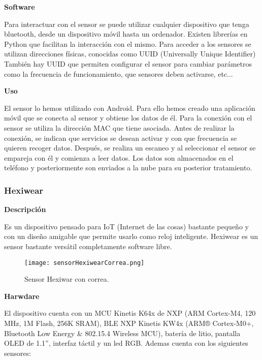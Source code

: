 \documentclass[11pt,spanish]{article}
\begin{document}
{\bf Software}
\newline

Para interactuar con el sensor se puede utilizar cualquier dispositivo que tenga bluetooth, desde un dispositivo móvil hasta un ordenador. Existen librerías en Python que facilitan la interacción con el mismo. Para acceder a los sensores se utilizan direcciones físicas, conocidas como UUID (Universally Unique Identifier) También hay UUID que permiten configurar el sensor para cambiar parámetros como la frecuencia de funcionamiento, que sensores deben activarse, etc...
\newline

{\bf Uso}
\newline

El sensor lo hemos utilizado con Android. Para ello hemos creado una aplicación móvil que se conecta al sensor y obtiene los datos de él. Para la conexión con el sensor se utiliza la dirección MAC que tiene asociada. Antes de realizar la conexión, se indican que servicios se desean activar y con que frecuencia se quieren recoger datos. Después, se realiza un escaneo y al seleccionar el sensor se empareja con él y comienza a leer datos. Los datos son almacenados en el teléfono y posteriormente son enviados a la nube para su posterior tratamiento.

\subsubsection{Hexiwear}
{\bf Descripción}
\newline

Es un dispositivo pensado para IoT (Internet de las cosas) bastante pequeño y con un diseño amigable que permite usarlo como reloj inteligente. Hexiwear es un sensor bastante versátil completamente software libre.
\newline

\begin{figure}
  \centering
  \texttt{[image: sensorHexiwearCorrea.png]}
  \caption{Sensor Hexiwar con correa.}
\end{figure}

{\bf Harwdare}
\newline

El dispositivo cuenta con un MCU Kinetis K64x de NXP (ARM Cortex-M4, 120 MHz, 1M Flash, 256K SRAM), BLE NXP Kinetis KW4x (ARM® Cortex-M0+, Bluetooth Low Energy \& 802.15.4 Wireless MCU), batería de litio, pantalla OLED
de 1.1'', interfaz táctil y un led RGB. Ademas cuenta con los siguientes sensores:
\end{document}
